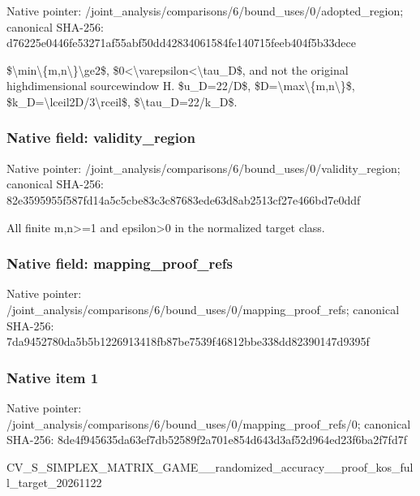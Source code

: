 \documentclass[10pt,a4paper]{article}
\begin{document}
Native pointer: /joint\_analysis/comparis\allowbreak{}ons/6/bound\_uses/0/adopt\allowbreak{}ed\_region; canonical SHA-256: d76225e0446fe53271af55ab\allowbreak{}f50dd42834061584fe140715\allowbreak{}feeb404f5b33dece


\$\textbackslash{}min\textbackslash{}\{m,n\textbackslash{}\}\textbackslash{}ge2\$, \$0<\textbackslash{}varepsilon<\textbackslash{}tau\_D\$, and not the original highdimensional sourcewindow H. \$u\_D=22/D\$, \$D=\textbackslash{}max\textbackslash{}\{m,n\textbackslash{}\}\$, \$k\_D=\textbackslash{}lceil2D/3\textbackslash{}rceil\$, \$\textbackslash{}tau\_D=22/k\_D\$.


\subsubsection{Native field: validity\_region}


Native pointer: /joint\_analysis/comparis\allowbreak{}ons/6/bound\_uses/0/valid\allowbreak{}ity\_region; canonical SHA-256: 82e3595955f587fd14a5c5cb\allowbreak{}e83c3c87683ede63d8ab2513\allowbreak{}cf27e466bd7e0ddf


All finite m,n>=1 and epsilon>0 in the normalized target class.


\subsubsection{Native field: mapping\_proof\_refs}


Native pointer: /joint\_analysis/comparis\allowbreak{}ons/6/bound\_uses/0/mappi\allowbreak{}ng\_proof\_refs; canonical SHA-256: 7da9452780da5b5b12269134\allowbreak{}18fb87be7539f46812bbe338\allowbreak{}dd82390147d9395f



\subsubsection{Native item 1}


Native pointer: /joint\_analysis/comparis\allowbreak{}ons/6/bound\_uses/0/mappi\allowbreak{}ng\_proof\_refs/0; canonical SHA-256: 8de4f945635da63ef7db5258\allowbreak{}9f2a701e854d643d3af52d96\allowbreak{}4ed23f6ba2f7fd7f


CV\_S\_SIMPLEX\_MATRIX\_GAME\allowbreak{}\_\_randomized\_accuracy\_\_p\allowbreak{}roof\_kos\_full\_target\_202\allowbreak{}61122
\end{document}
